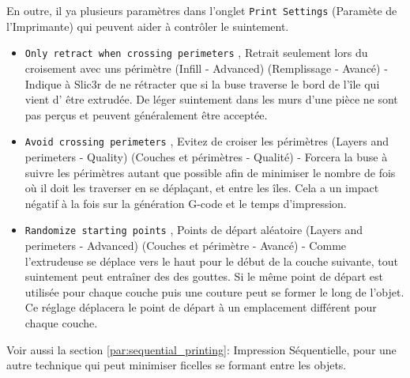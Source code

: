 En outre, il ya plusieurs param\`etres dans l'onglet \texttt{Print Settings} (Param\`ete de l'Imprimante) qui peuvent aider \`a contr\^oler le suintement.

\begin{itemize}
    \item \texttt{Only retract when crossing perimeters} , Retrait seulement lors du croisement avec uns p\'erim\`etre (Infill - Advanced) (Remplissage - Avanc\'e) - Indique \`a Slic3r de ne r\'etracter que si la buse traverse le bord de l'\^ile qui vient d' \^etre extrud\'ee. De l\'eger suintement dans les murs d'une pi\`ece ne sont pas perçus et peuvent g\'en\'eralement \^etre accept\'ee.
	\item \texttt{Avoid crossing perimeters} , Evitez de croiser les p\'erim\`etres (Layers and perimeters - Quality) (Couches et p\'erim\`etres - Qualit\'e) - Forcera la buse \`a suivre les p\'erim\`etres autant que possible afin de minimiser le nombre de fois o\`u il doit les traverser en se d\'eplaçant, et entre les \^iles. Cela a un impact n\'egatif \`a la fois sur la g\'en\'eration G-code et le temps d'impression.
	\item \texttt{Randomize starting points} , Points de d\'epart al\'eatoire (Layers and perimeters - Advanced) (Couches et p\'erim\`etre - Avanc\'e) - Comme l'extrudeuse se d\'eplace vers le haut pour le d\'ebut de la couche suivante, tout suintement peut entra\^iner des des gouttes. Si le m\^eme point de d\'epart est utilis\'ee pour chaque couche puis une couture peut se former le long de l'objet. Ce r\'eglage d\'eplacera le point de d\'epart \`a un emplacement diff\'erent pour chaque couche.
\end{itemize}


Voir aussi la section \ref{par:sequential_printing}: Impression S\'equentielle, pour une autre technique qui peut minimiser ficelles se formant entre les objets.
